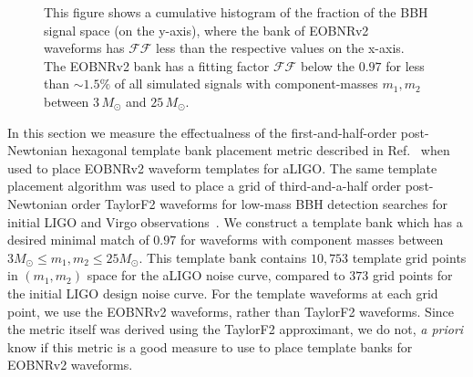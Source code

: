 \begin{figure}
	\begin{center}
	\end{center}
\caption{This figure shows a cumulative histogram of the fraction of the BBH
signal space (on the y-axis), where the bank of EOBNRv2 waveforms has
$\mathcal{FF}$ less than the respective values on the x-axis.  The EOBNRv2
bank has a fitting factor $\mathcal{FF}$ below the $0.97$ for less than $\sim
1.5\%$ of all simulated signals with component-masses $m_1, m_2$ between
$3\, M_\odot$ and $25\,M_{\odot}$.} \label{fig:cumhist_eobeob_all}
\end{figure} 

In this section we measure the effectualness of the first-and-half-order
post-Newtonian hexagonal template bank placement metric described in
Ref.~\cite{BabaketalBankPlacement} when used to place EOBNRv2 waveform
templates for aLIGO.  The same template placement algorithm was used to place
a grid of third-and-a-half order post-Newtonian order TaylorF2 waveforms for
low-mass BBH detection searches for initial LIGO and Virgo
observations~\cite{Colaboration:2011nz,Abadie:2010yb,Abbott:2009qj,Abbott:2009tt,Messaritaki:2005wv}.
We construct a template bank which
has a desired minimal match of $0.97$ for waveforms with component masses
between $3 M_\odot \le m_1, m_2 \le 25 M_\odot$. This template
bank contains $10,753$ template grid points in $(m_1,m_2)$ space for the aLIGO noise curve, 
compared to $373$ grid points for the initial LIGO design noise
curve. For the template waveforms at each grid point, we use the EOBNRv2
waveforms, rather than TaylorF2 waveforms.  Since the metric itself was
derived using the TaylorF2 approximant, we do not, \textit{a priori}
know if this metric is a good measure to use to place template banks for
EOBNRv2 waveforms. 

